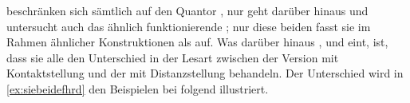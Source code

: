 




\textcites{sportiche1988,shlonsky1991,merchant1996} beschränken sich sämtlich
auf den Quantor , nur \citet{pittner1995} geht darüber hinaus und
untersucht auch das ähnlich funktionierende ; nur diese beiden fasst
sie im Rahmen ähnlicher Konstruktionen als  auf. Was
darüber hinaus \citeauthor{shlonsky1991}, \citeauthor{pittner1995} und
\citeauthor{merchant1996} eint, ist, dass sie alle den Unterschied in der
Lesart zwischen der Version mit Kontaktstellung und der mit Distanzstellung
behandeln. Der Unterschied wird in \cref{ex:siebeidefhrd} den Beispielen bei
\citet[30--31]{pittner1995} folgend illustriert.

